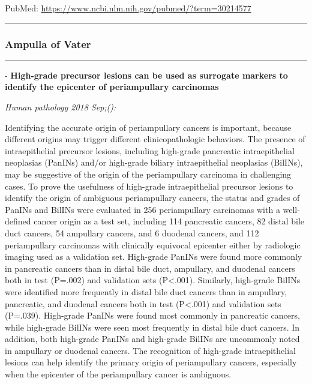 \documentclass[]{article}
\begin{document}
PubMed: \url{https://www.ncbi.nlm.nih.gov/pubmed/?term=30214577}

{}

{}

\begin{center}\rule{0.5\linewidth}{\linethickness}\end{center}

\hypertarget{ampulla-of-vater}{%
\subsubsection{Ampulla of Vater}\label{ampulla-of-vater}}

\begin{center}\rule{0.5\linewidth}{\linethickness}\end{center}

 - \textbf{High-grade precursor lesions can be used as surrogate markers
to identify the epicenter of periampullary carcinomas}

\emph{Human pathology 2018 Sep;():}

Identifying the accurate origin of periampullary cancers is important,
because different origins may trigger different clinicopathologic
behaviors. The presence of intraepithelial precursor lesions, including
high-grade pancreatic intraepithelial neoplasias (PanINs) and/or
high-grade biliary intraepithelial neoplasias (BilINs), may be
suggestive of the origin of the periampullary carcinoma in challenging
cases. To prove the usefulness of high-grade intraepithelial precursor
lesions to identify the origin of ambiguous periampullary cancers, the
status and grades of PanINs and BilINs were evaluated in 256
periampullary carcinomas with a well-defined cancer origin as a test
set, including 114 pancreatic cancers, 82 distal bile duct cancers, 54
ampullary cancers, and 6 duodenal cancers, and 112 periampullary
carcinomas with clinically equivocal epicenter either by radiologic
imaging used as a validation set. High-grade PanINs were found more
commonly in pancreatic cancers than in distal bile duct, ampullary, and
duodenal cancers both in test (P=.002) and validation sets
(P\textless{}.001). Similarly, high-grade BilINs were identified more
frequently in distal bile duct cancers than in ampullary, pancreatic,
and duodenal cancers both in test (P\textless{}.001) and validation sets
(P=.039). High-grade PanINs were found most commonly in pancreatic
cancers, while high-grade BilINs were seen most frequently in distal
bile duct cancers. In addition, both high-grade PanINs and high-grade
BilINs are uncommonly noted in ampullary or duodenal cancers. The
recognition of high-grade intraepithelial lesions can help identify the
primary origin of periampullary cancers, especially when the epicenter
of the periampullary cancer is ambiguous.
\end{document}
